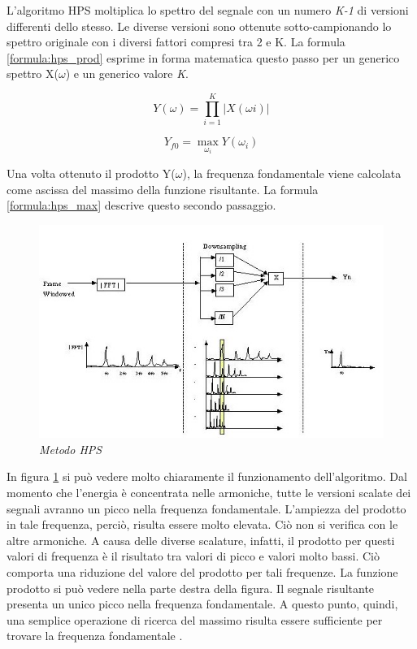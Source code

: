 	L'algoritmo HPS moltiplica lo spettro del segnale con un numero \emph{K-1} di versioni differenti dello stesso.
	Le diverse versioni sono ottenute sotto-campionando lo spettro originale con i diversi fattori compresi tra 2 e K.
	La formula \ref{formula:hps_prod} esprime in forma matematica questo passo per un generico spettro X($\omega$) e un generico valore \emph{K}.

		\begin{equation}\label{formula:hps_prod}
			Y(\omega) = \prod_{i=1}^K \left | X(\omega i) \right |
		\end{equation}

		\begin{equation}\label{formula:hps_max}
			Y_{f0} = \max_{\omega_i} Y \left(\omega_i \right )
		\end{equation}

	Una volta ottenuto il prodotto Y($\omega$), la frequenza fondamentale viene calcolata come ascissa del massimo della funzione risultante. 
	La formula \ref{formula:hps_max} descrive questo secondo passaggio.

		

	\begin{figure}[h]
		  \begin{center} 
		    \includegraphics[width=\textwidth*\real{0.9}]{images/ch_04/processo.jpg}
		  \end{center} 
		  \caption{\textit{Metodo HPS}}  
		  \label{fig:HPS}
		\end{figure}

	In figura \ref{fig:HPS} si può vedere molto chiaramente il funzionamento dell'algoritmo. 
	Dal momento che l'energia è concentrata nelle armoniche, tutte le versioni scalate dei segnali avranno un picco nella frequenza fondamentale. 
	L'ampiezza del prodotto in tale frequenza, perciò, risulta essere molto elevata.
	Ciò non si verifica con le altre armoniche.
	A causa delle diverse scalature, infatti, il prodotto per questi valori di frequenza è il risultato tra valori di picco e valori molto bassi.
	Ciò comporta una riduzione del valore del prodotto per tali frequenze. 
	La funzione prodotto si può vedere nella parte destra della figura. 
	Il segnale risultante presenta un unico picco nella frequenza fondamentale.
	A questo punto, quindi, una semplice operazione di ricerca del massimo risulta essere sufficiente per trovare la frequenza fondamentale \cite{Cuadra01efficientpitch}.

